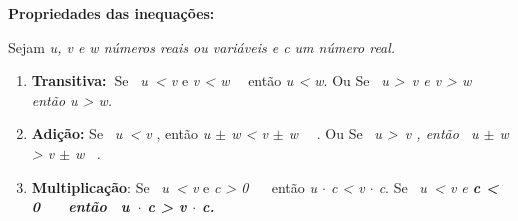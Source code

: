 \textbf{Propriedades das inequações:}

\begin{caixa}

Sejam \textit{u, v e w números reais ou variáveis e c um número real.}
\begin{enumerate}[label*=\arabic*.]
	\item \textbf{Transitiva:~}Se~ \textit{u~< v  }e \textit{v < w}~~ então \textit{u < w}. Ou
Se~ \textit{u >~v  e v > w~~ então u > w.}

	\item \textbf{Adição:} Se~ \textit{u~< v  }, então  \textit{u $ \pm $  w < v $ \pm $  w}~~ . Ou
Se~ \textit{u >~v  , então~ u $ \pm $  w > v $ \pm $  w~ .}

	\item \textbf{Multiplicação}:  Se~ \textit{u~< v  }e \textit{c > 0 }~~ então  \textit{u $ \cdot $  c  < v $ \cdot $  c}. 
Se~ \textit{u~< v  e \textbf{c < 0 ~~ então~ u~$ \cdot $  c  > v $ \cdot $  c.}}

\end{enumerate}

\end{caixa}

